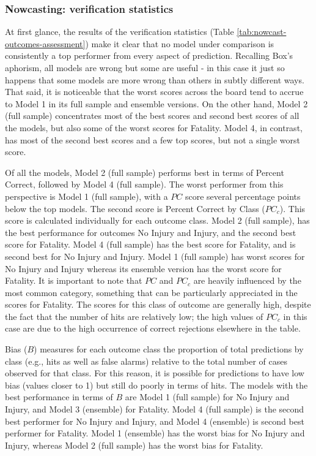 \documentclass[]{elsarticle} %
\begin{document}
\hypertarget{nowcasting-verification-statistics}{%
\subsubsection{Nowcasting: verification
statistics}\label{nowcasting-verification-statistics}}

At first glance, the results of the verification statistics (Table
\ref{tab:nowcast-outcomes-assessment}) make it clear that no model under
comparison is consistently a top performer from every aspect of
prediction. Recalling Box's aphorism, all models are wrong but some are
useful - in this case it just so happens that some models are more wrong
than others in subtly different ways. That said, it is noticeable that
the worst scores across the board tend to accrue to Model 1 in its full
sample and ensemble versions. On the other hand, Model 2 (full sample)
concentrates most of the best scores and second best scores of all the
models, but also some of the worst scores for Fatality. Model 4, in
contrast, has most of the second best scores and a few top scores, but
not a single worst score.

Of all the models, Model 2 (full sample) performs best in terms of
Percent Correct, followed by Model 4 (full sample). The worst performer
from this perspective is Model 1 (full sample), with a \(PC\) score
several percentage points below the top models. The second score is
Percent Correct by Class (\(PC_c\)). This score is calculated
individually for each outcome class. Model 2 (full sample), has the best
performance for outcomes No Injury and Injury, and the second best score
for Fatality. Model 4 (full sample) has the best score for Fatality, and
is second best for No Injury and Injury. Model 1 (full sample) has worst
scores for No Injury and Injury whereas its ensemble version has the
worst score for Fatality. It is important to note that \(PC\) and
\(PC_c\) are heavily influenced by the most common category, something
that can be particularly appreciated in the scores for Fatality. The
scores for this class of outcome are generally high, despite the fact
that the number of hits are relatively low; the high values of \(PC_c\)
in this case are due to the high occurrence of correct rejections
elsewhere in the table.

Bias (\(B\)) measures for each outcome class the proportion of total
predictions by class (e.g., hits as well as false alarms) relative to
the total number of cases observed for that class. For this reason, it
is possible for predictions to have low bias (values closer to 1) but
still do poorly in terms of hits. The models with the best performance
in terms of \(B\) are Model 1 (full sample) for No Injury and Injury,
and Model 3 (ensemble) for Fatality. Model 4 (full sample) is the second
best performer for No Injury and Injury, and Model 4 (ensemble) is
second best performer for Fatality. Model 1 (ensemble) has the worst
bias for No Injury and Injury, whereas Model 2 (full sample) has the
worst bias for Fatality.
\end{document}
